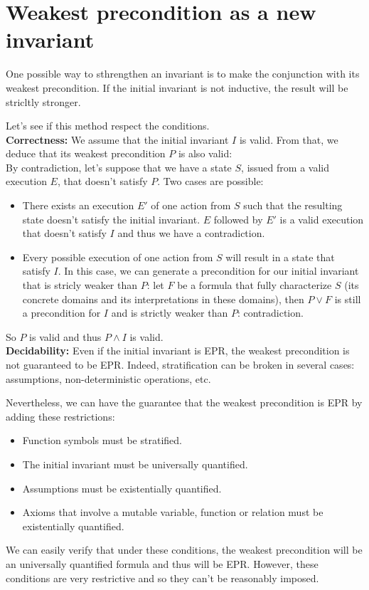 \documentclass[11pt,a4paper,oldfontcommands]{memoir}
\begin{document}
    \section{Weakest precondition as a new invariant}

    One possible way to sthrengthen an invariant is to make the conjunction with its weakest precondition.
    If the initial invariant is not inductive, the result will be stricltly stronger.

    Let's see if this method respect the conditions.\\
    
    \textbf{Correctness:} We assume that the initial invariant \(I\) is valid. From that, we deduce that its weakest precondition \(P\) is also valid:
    \\

    By contradiction, let's suppose that we have a state \(S\), issued from a valid execution \(E\), that doesn't satisfy \(P\).
    Two cases are possible:
    \begin{itemize}
        \item There exists an execution \(E'\) of one action from \(S\) such that the resulting state doesn't satisfy the initial invariant.
        \(E\) followed by \(E'\) is a valid execution that doesn't satisfy \(I\) and thus we have a contradiction.
        \item Every possible execution of one action from \(S\) will result in a state that satisfy \(I\).
        In this case, we can generate a precondition for our initial invariant that is stricly weaker than \(P\):
        let \(F\) be a formula that fully characterize \(S\) (its concrete domains and its interpretations in these domains),
        then \(P \lor F\) is still a precondition for \(I\) and is strictly weaker than \(P\): contradiction. 
    \end{itemize}

    So \(P\) is valid and thus \(P \land I\) is valid.\\

    \textbf{Decidability:} Even if the initial invariant is EPR, the weakest precondition is not guaranteed to be EPR.
    Indeed, stratification can be broken in several cases: assumptions, non-deterministic operations, etc.

    Nevertheless, we can have the guarantee that the weakest precondition is EPR by adding these restrictions:
    \begin{itemize}
        \item Function symbols must be stratified.
        \item The initial invariant must be universally quantified.
        \item Assumptions must be existentially quantified.
        \item Axioms that involve a mutable variable, function or relation must be existentially quantified.
    \end{itemize}
    We can easily verify that under these conditions, the weakest precondition will be an universally quantified formula
    and thus will be EPR. However, these conditions are very restrictive and so they can't be reasonably imposed.
    \\
\end{document}
